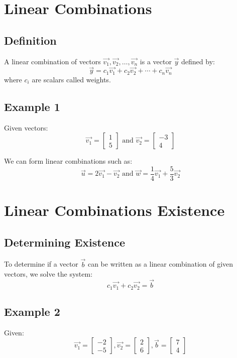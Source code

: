 \documentclass{article}
\begin{document}
\section{Linear Combinations}

\subsection{Definition}
A linear combination of vectors $\vec{v_1}, \vec{v_2}, \ldots, \vec{v_n}$ is a vector $\vec{y}$ defined by:
\[
\vec{y} = c_1\vec{v_1} + c_2\vec{v_2} + \cdots + c_n\vec{v_n}
\]
where $c_i$ are scalars called weights.

\subsection{Example 1}
Given vectors:
\[
\vec{v_1} = \begin{bmatrix} 1 \\ 5 \end{bmatrix} \text{ and }
\vec{v_2} = \begin{bmatrix} -3 \\ 4 \end{bmatrix}
\]

We can form linear combinations such as:
\[
\vec{u} = 2\vec{v_1} - \vec{v_2} \text{ and }
\vec{w} = \frac{1}{4}\vec{v_1} + \frac{5}{3}\vec{v_2}
\]

\section{Linear Combinations Existence}

\subsection{Determining Existence}
To determine if a vector $\vec{b}$ can be written as a linear combination of given vectors, we solve the system:
\[
c_1\vec{v_1} + c_2\vec{v_2} = \vec{b}
\]

\subsection{Example 2}
Given:
\[
\vec{v_1} = \begin{bmatrix} -2 \\ -5 \end{bmatrix}, 
\vec{v_2} = \begin{bmatrix} 2 \\ 6 \end{bmatrix}, 
\vec{b} = \begin{bmatrix} 7 \\ 4 \end{bmatrix}
\]
\end{document}

